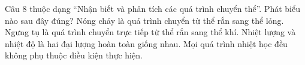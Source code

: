 \begin{ex}
Câu 8 thuộc dạng “Nhận biết và phân tích các quá trình chuyển thể”. Phát biểu nào sau đây đúng?
\choice
{\True Nóng chảy là quá trình chuyển từ thể rắn sang thể lỏng.}
{Ngưng tụ là quá trình chuyển trực tiếp từ thể rắn sang thể khí.}
{Nhiệt lượng và nhiệt độ là hai đại lượng hoàn toàn giống nhau.}
{Mọi quá trình nhiệt học đều không phụ thuộc điều kiện thực hiện.}
\end{ex}
